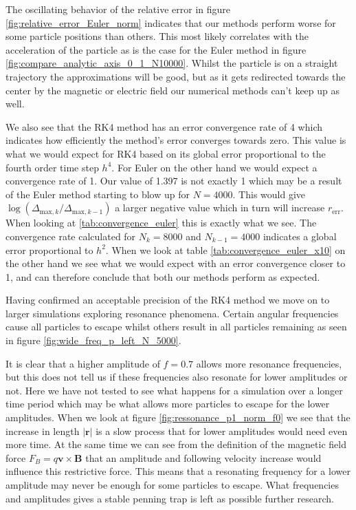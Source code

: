 \documentclass[english,notitlepage,reprint,nofootinbib]{revtex4-1}  %
\begin{document}
The oscillating behavior of the relative error in figure \ref{fig:relative_error_Euler_norm} indicates that our methods perform worse for some particle positions than others. This most likely correlates with the acceleration of the particle as is the case for the Euler method in figure \ref{fig:compare_analytic_axis_0_1_N10000}. Whilst the particle is on a straight trajectory the approximations will be good, but as it gets redirected towards the center by the magnetic or electric field our numerical methods can't keep up as well.

We also see that the RK4 method has an error convergence rate of 4 which indicates how efficiently the method's error converges towards zero. This value is what we would expect for RK4 based on its global error proportional to the fourth order time step $h^4$. For Euler on the other hand we would expect a convergence rate of 1. Our value of 1.397 is not exactly 1 which may be a result of the Euler method starting to blow up for $N=4000$. This would give $\log(\Delta_{\text{max},k}/\Delta_{\text{max},k-1})$ a larger negative value which in turn will increase $r_{\text{err}}$. When looking at \ref{tab:convergence_euler} this is exactly what we see. The convergence rate calculated for $N_k = 8000$ and $N_{k-1} = 4000$ indicates a global error proportional to $h^2$. When we look at table \ref{tab:convergence_euler_x10} on the other hand we see what we would expect with an error convergence closer to 1, and can therefore conclude that both our methods perform as expected.

Having confirmed an acceptable precision of the RK4 method we move on to larger simulations exploring resonance phenomena. Certain angular frequencies cause all particles to escape whilst others result in all particles remaining as seen in figure \ref{fig:wide_freq_p_left_N_5000}.

It is clear that a higher amplitude of $f=0.7$ allows more resonance frequencies, but this does not tell us if these frequencies also resonate for lower amplitudes or not. Here we have not tested to see what happens for a simulation over a longer time period which may be what allows more particles to escape for the lower amplitudes. When we look at figure \ref{fig:ressonance_p1_norm_f0} we see that the increase in length $|\boldsymbol{r}|$ is a slow process that for lower amplitudes would need even more time. At the same time we can see from the definition of the magnetic field force $F_B =q \boldsymbol{v}\times \boldsymbol{B}$ that an amplitude and following velocity increase would influence this restrictive force. This means that a resonating frequency for a lower amplitude may never be enough for some particles to escape. What frequencies and amplitudes gives a stable penning trap is left as possible further research.
\end{document}
